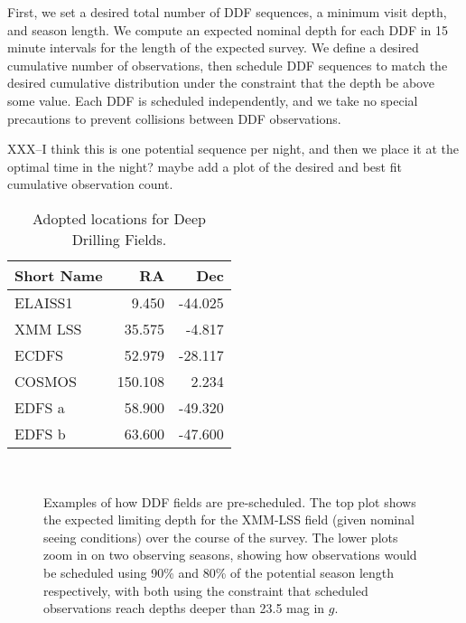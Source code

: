 \documentclass[]{aastex631}
\begin{document}
First, we set a desired total number of DDF sequences, a minimum visit depth, and season length. We compute an expected nominal depth for each DDF in 15 minute intervals for the length of the expected survey. We define a desired cumulative number of observations, then schedule DDF sequences to match the desired cumulative distribution under the constraint that the depth be above some value. Each DDF is scheduled independently, and we take no special precautions to prevent collisions between DDF observations. 

XXX--I think this is one potential sequence per night, and then we place it at the optimal time in the night? maybe add a plot of the desired and best fit cumulative observation count.


\begin{table}
    \centering
        \begin{tabular}{lrr}
            \toprule
            Short Name & RA & Dec \\
            \midrule
            ELAISS1 & 9.450 & -44.025 \\
            XMM LSS & 35.575 & -4.817 \\
            ECDFS & 52.979 & -28.117 \\
            COSMOS & 150.108 & 2.234 \\
            EDFS a & 58.900 & -49.320 \\
            EDFS b & 63.600 & -47.600 \\
            \bottomrule
            \end{tabular}
    \caption{Adopted locations for Deep Drilling Fields.}
    \label{tab:ddf_loc}
\end{table}


\begin{figure}
    \\
    \caption{Examples of how DDF fields are pre-scheduled. The top plot shows the expected limiting depth for the XMM-LSS field (given nominal seeing conditions) over the course of the survey. The lower plots zoom in on two observing seasons, showing how observations would be scheduled using 90\% and 80\% of the potential season length respectively, with both using the constraint that scheduled observations reach depths deeper than 23.5 mag in $g$.}
    \label{fig:ddf_examples}
\end{figure}
\end{document}
